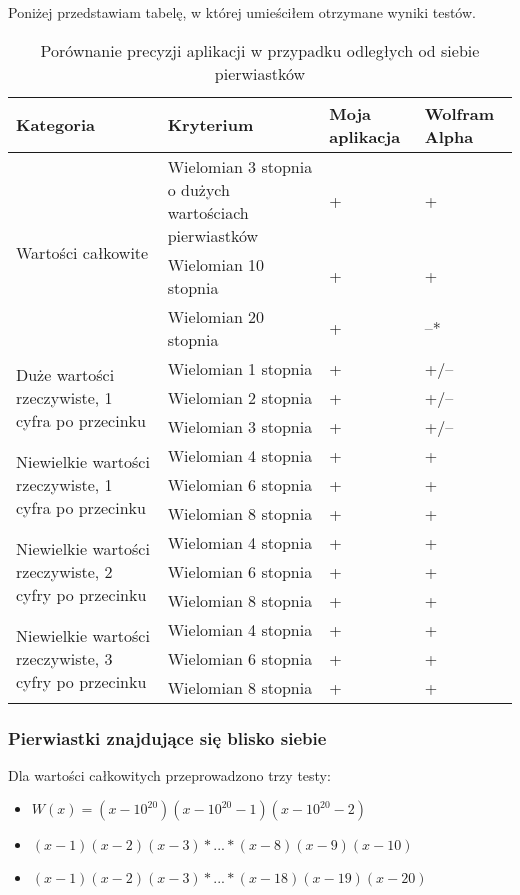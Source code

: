 Poniżej przedstawiam tabelę, w której umieściłem otrzymane wyniki testów.

\begin{table}[H]
	\begin{tabular}{ |p{5cm}|p{5cm}|p{1.5cm}|p{1.5cm}| } 
		\hline
		Kategoria & Kryterium & Moja aplikacja & Wolfram Alpha \\
		\hline
		\multirow{3}{*}{Wartości całkowite}
		& Wielomian 3 stopnia o dużych wartościach pierwiastków & + & + \\
		& Wielomian 10 stopnia & + & + \\
		& Wielomian 20 stopnia & + & --* \\
		\hline
		\multirow{3}{12em}{Duże wartości rzeczywiste, 1 cyfra po przecinku}
		& Wielomian 1 stopnia & + & +/-- \\
		& Wielomian 2 stopnia & + & +/-- \\
		& Wielomian 3 stopnia & + & +/-- \\
		\hline
		\multirow{3}{14em}{Niewielkie wartości rzeczywiste, 1 cyfra po przecinku}
		& Wielomian 4 stopnia & + & + \\
		& Wielomian 6 stopnia & + & + \\
		& Wielomian 8 stopnia & + & + \\
		\hline
		\multirow{3}{14em}{Niewielkie wartości rzeczywiste, 2 cyfry po przecinku}
		& Wielomian 4 stopnia & + & + \\
		& Wielomian 6 stopnia & + & + \\
		& Wielomian 8 stopnia & + & + \\
		\hline
		\multirow{3}{14em}{Niewielkie wartości rzeczywiste, 3 cyfry po przecinku}
		& Wielomian 4 stopnia & + & + \\
		& Wielomian 6 stopnia & + & + \\
		& Wielomian 8 stopnia & + & + \\
		\hline
	\end{tabular}
	\caption{Porównanie precyzji aplikacji w przypadku odległych od siebie pierwiastków}
\end{table}

\subsubsection {Pierwiastki znajdujące się blisko siebie}

Dla wartości całkowitych przeprowadzono trzy testy:
\begin{itemize}
	\item $W(x)=(x-10^{20})(x-10^{20}-1)(x-10^{20}-2)$
	\item $(x-1)(x-2)(x-3)*...*(x-8)(x-9)(x-10)$
	\item $(x-1)(x-2)(x-3)*...*(x-18)(x-19)(x-20)$
\end{itemize}

